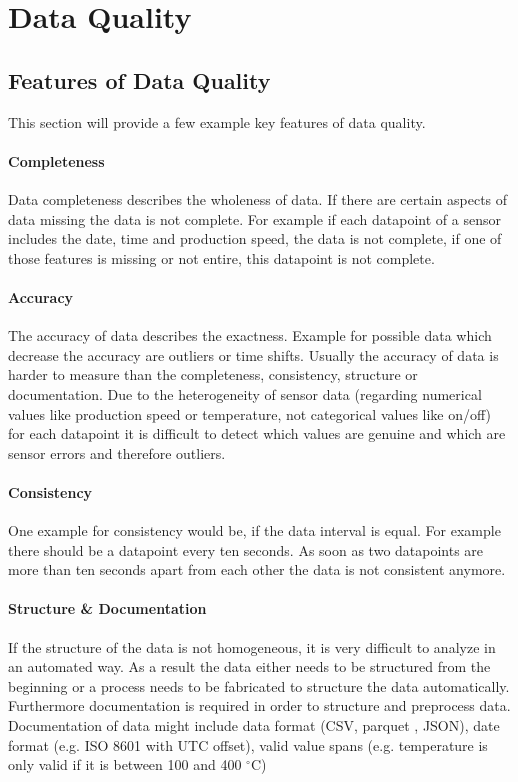 \chapter{Data Quality}\label{chapter:data-quality}

\section{Features of Data Quality}\label{section:data-quality-features}
This section will provide a few example key features of data quality. 
\subsubsection{Completeness}
Data completeness describes the wholeness of data. If there are certain aspects of data missing the data is not complete. For example if each datapoint of a sensor includes the date, time and production speed, the data is not complete, if one of those features is missing or not entire, this datapoint is not complete. \cite{caiChallengesDataQuality2015, songIoTDataQuality2020}
\subsubsection{Accuracy}
The accuracy of data describes the exactness. Example for possible data which decrease the accuracy are outliers or time shifts. Usually the accuracy of data is harder to measure than the completeness, consistency, structure or documentation. Due to the heterogeneity of sensor data (regarding numerical values like production speed or temperature, not categorical values like on/off) for each datapoint it is difficult to detect which values are genuine and which are sensor errors and therefore outliers. \cite{caiChallengesDataQuality2015}
\subsubsection{Consistency}
One example for consistency would be, if the data interval is equal. For example there should be a datapoint every ten seconds. As soon as two datapoints are more than ten seconds apart from each other the data is not consistent anymore. \cite{caiChallengesDataQuality2015}
\subsubsection{Structure \& Documentation}
If the structure of the data is not homogeneous, it is very difficult to analyze in an automated way. As a result the data either needs to be structured from the beginning or a process needs to be fabricated to structure the data automatically. Furthermore documentation is required in order to structure and preprocess data. Documentation of data might include data format (\ac{CSV}, parquet \cite{ApacheParquet2021}, \ac{JSON}), date format (e.g. ISO 8601 with UTC offset), valid value spans (e.g. temperature is only valid if it is between 100 and 400 $^{\circ}$C)
\cite{caiChallengesDataQuality2015}


